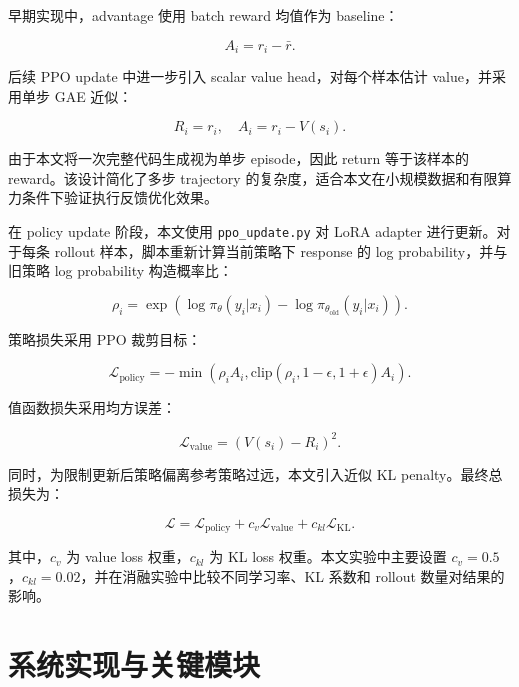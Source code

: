 早期实现中，advantage 使用 batch reward 均值作为 baseline：

\begin{equation}
  A_i = r_i - \bar{r}.
\end{equation}

后续 PPO update 中进一步引入 scalar value head，对每个样本估计 value，并采用单步 GAE 近似：

\begin{equation}
  R_i = r_i,\quad A_i = r_i - V(s_i).
\end{equation}

由于本文将一次完整代码生成视为单步 episode，因此 return 等于该样本的 reward。该设计简化了多步 trajectory 的复杂度，适合本文在小规模数据和有限算力条件下验证执行反馈优化效果。

在 policy update 阶段，本文使用 \texttt{ppo\_update.py} 对 LoRA adapter 进行更新。对于每条 rollout 样本，脚本重新计算当前策略下 response 的 log probability，并与旧策略 log probability 构造概率比：

\begin{equation}
  \rho_i=\exp(\log \pi_{\theta}(y_i|x_i)-\log \pi_{\theta_{\mathrm{old}}}(y_i|x_i)).
\end{equation}

策略损失采用 PPO 裁剪目标：

\begin{equation}
  \mathcal{L}_{\mathrm{policy}}
  =-\min(\rho_i A_i,\mathrm{clip}(\rho_i,1-\epsilon,1+\epsilon)A_i).
\end{equation}

值函数损失采用均方误差：

\begin{equation}
  \mathcal{L}_{\mathrm{value}}=(V(s_i)-R_i)^2.
\end{equation}

同时，为限制更新后策略偏离参考策略过远，本文引入近似 KL penalty。最终总损失为：

\begin{equation}
  \mathcal{L}
  =
  \mathcal{L}_{\mathrm{policy}}
  +c_v\mathcal{L}_{\mathrm{value}}
  +c_{kl}\mathcal{L}_{\mathrm{KL}}.
\end{equation}

其中，$c_v$ 为 value loss 权重，$c_{kl}$ 为 KL loss 权重。本文实验中主要设置 $c_v=0.5$，$c_{kl}=0.02$，并在消融实验中比较不同学习率、KL 系数和 rollout 数量对结果的影响。

\section{系统实现与关键模块}

